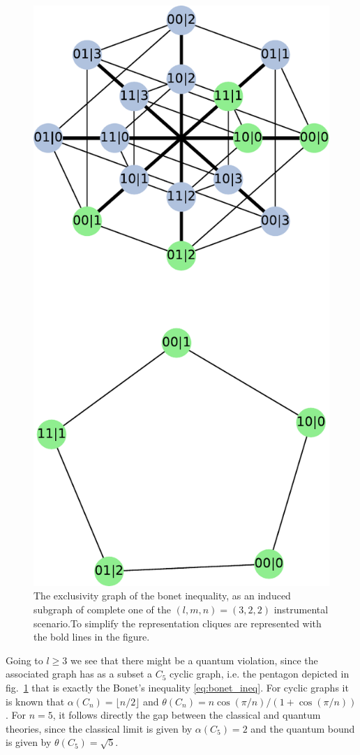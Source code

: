 \documentclass[letterpaper]{article}
\begin{document}
\begin{figure}[t]
    \centering
    \includegraphics[width=.6\columnwidth]{images/instrumental_c5.pdf}
    \caption{The exclusivity graph of the bonet inequality, as an induced
    subgraph of complete one of the $(l,m,n)=(3,2,2)$ instrumental scenario.To
    simplify the representation cliques are represented with the bold
    lines in the figure.}
    \label{fig:bonetexc}
\end{figure}

Going to $l\ge3$ we see that there might be a quantum violation, since the
associated graph has as a subset a $C_5$ cyclic graph, i.e. the pentagon
depicted in
fig.~\ref{fig:bonetexc} that is exactly the Bonet's inequality \eqref{eq:bonet_ineq}.
For cyclic graphs it is known that $\alpha(C_n) = \lfloor n/2 \rfloor$ and
$\theta(C_n) = n\cos(\pi/n)/(1+\cos(\pi/n))$. For $n=5$, it follows directly the
gap between the classical and quantum theories, since the classical limit is
given by $\alpha(C_5)=2$ and the quantum bound is given by $\theta(C_5)=\sqrt{5}$.
\end{document}
